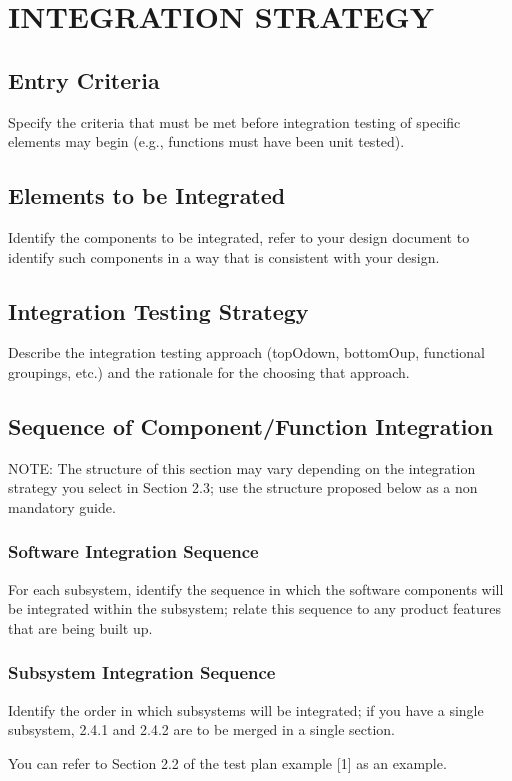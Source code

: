 \section{INTEGRATION STRATEGY}
\subsection{Entry Criteria}
Specify  the  criteria  that  must  be  met  before  integration  testing  of  specific  elements 
may begin (e.g., functions must have been unit tested).  
   
\subsection{Elements to be Integrated}
Identify  the  components  to  be  integrated,  refer  to  your  design  document  to  identify 
such components in a way that is consistent with your design.

\subsection{Integration Testing Strategy}
Describe the integration testing approach (topOdown, bottomOup, functional groupings, 
etc.) and the rationale for the choosing that approach. 

\subsection{Sequence of Component/Function Integration} 
NOTE:    The  structure  of  this  section  may  vary  depending  on  the  integration  strategy  you select in Section 2.3; use the structure proposed below as a non mandatory guide.

\subsubsection{Software  Integration  Sequence}
For  each  subsystem,  identify  the  sequence  in  which  the  software  components  will  be  integrated  within  the  subsystem;  relate  this  sequence to any product features that are being built up.  

\subsubsection{Subsystem  Integration  Sequence}  
Identify  the  order  in  which  subsystems  will  be  integrated;  if  you  have  a  single  subsystem,  2.4.1  and  2.4.2  are  to  be  merged  in  a  single section.  
 
You can refer to Section 2.2 of the test plan example [1] as an example. 